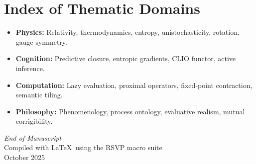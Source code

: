 \documentclass[12pt,a4paper]{article}
\theoremstyle{plain}
\begin{document}
\clearpage
{}
{}
\section*{Index of Thematic Domains}

\begin{itemize}[leftmargin=2em]
  \item \textbf{Physics:} Relativity, thermodynamics, entropy, unistochasticity, rotation, gauge symmetry.
  \item \textbf{Cognition:} Predictive closure, entropic gradients, CLIO functor, active inference.
  \item \textbf{Computation:} Lazy evaluation, proximal operators, fixed‐point contraction, semantic tiling.
  \item \textbf{Philosophy:} Phenomenology, process ontology, evaluative realism, mutual corrigibility.
\end{itemize}

\clearpage
\thispagestyle{empty}
\vspace*{\fill}
\begin{center}
{\Large\itshape End of Manuscript}\\[1.5em]
Compiled with \LaTeX\ using the RSVP macro suite\\[0.5em]
{\small October 2025}
\end{center}
\vspace*{\fill}
\end{document}
